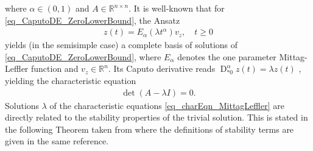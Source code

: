 \documentclass{svproc}
\newcommand{\realnumbers}{\mathbb{R}}
\newcommand{\AstderivativeInput}[2]{\operatorname{D}_{\ast #2}^{#1}}
\begin{document}
 where $\alpha \in (0,1)$ and $A\in \realnumbers^{n\times n}$.
It is well-known that for \eqref{eq_CaputoDE_ZeroLowerBound}, the Ansatz
\begin{align}
	\label{eq_ansatz_mittagLeffler} z(t) = E_\alpha(\lambda t^\alpha)v_z,\quad t\geq 0
\end{align}
yields (in the semisimple case) a complete basis of solutions of \eqref{eq_CaputoDE_ZeroLowerBound}, where $E_\alpha$ denotes the one parameter Mittag-Leffler function and $v_z\in \realnumbers^n$. Its Caputo derivative reads ${\AstderivativeInput{\alpha}{0}}z(t)=\lambda z(t)$ \cite{Diethelm2010}, yielding the characteristic equation
\begin{align}\label{eq_charEqn_MittagLeffler}
	\det (A-\lambda I) =0.
\end{align} Solutions $\lambda$ of the characteristic equations \eqref{eq_charEqn_MittagLeffler} are directly related to the stability properties of the trivial solution. This is stated in the following Theorem taken from \cite[Theorem 7.20]{Diethelm2010}  where the definitions of stability terms are given in the same reference.
\end{document}
